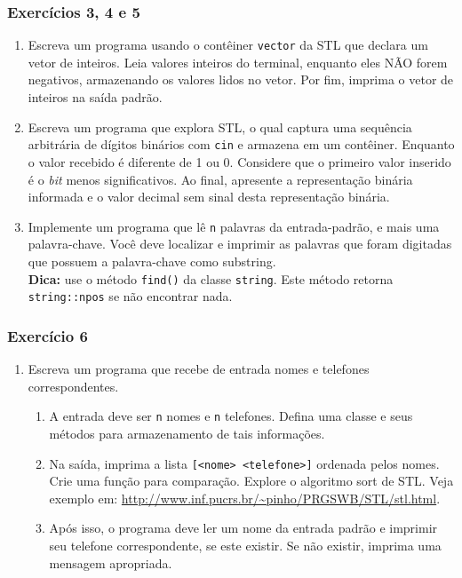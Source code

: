 \documentclass[xcolor={dvipsnames,table},aspectratio=169]{beamer}
\newcommand\setItemnumber[1]{\setcounter{enumi}{\numexpr#1-1\relax}}
\begin{document}
\begin{frame}[fragile]\frametitle{Exercícios 3, 4 e 5}
\begin{enumerate}
	\setItemnumber{3}
	\item Escreva um programa usando o contêiner \texttt{vector} da STL que declara um vetor de inteiros. Leia valores inteiros do terminal, enquanto eles NÃO forem negativos, armazenando os valores lidos no vetor. Por fim, imprima o vetor de inteiros na saída padrão.
	\item Escreva um programa que explora STL, o qual captura uma sequência arbitrária de dígitos binários com \texttt{cin} e armazena em um contêiner. Enquanto o valor recebido é diferente de 1 ou 0. Considere que o primeiro valor inserido é o \emph{bit} menos significativos. Ao final, apresente a representação binária informada e o valor decimal sem sinal desta representação binária.
	\item Implemente um programa que lê \texttt{n} palavras da entrada-padrão, e mais uma palavra-chave. Você deve localizar e imprimir as palavras que foram digitadas que possuem a palavra-chave como substring.\\
	\textbf{Dica:} use o método \texttt{find()} da classe \texttt{string}. Este método retorna \texttt{string::npos} se não encontrar nada.
\end{enumerate}
\end{frame}


\begin{frame}[fragile]\frametitle{Exercício 6}
\begin{enumerate}
	\setItemnumber{6}
	\item Escreva um programa que recebe de entrada nomes e telefones correspondentes.
	\begin{enumerate}[a]
		\item A entrada deve ser \texttt{n} nomes e \texttt{n} telefones. Defina uma classe e seus métodos para armazenamento de tais informações.
		\item Na saída, imprima a lista \texttt{[<nome> <telefone>]} ordenada pelos nomes. Crie uma função para comparação. Explore o algoritmo sort de STL. Veja exemplo em: \url{http://www.inf.pucrs.br/~pinho/PRGSWB/STL/stl.html}.
		\item Após isso, o programa deve ler um nome da entrada padrão e imprimir seu telefone correspondente, se este existir. Se não existir, imprima uma mensagem apropriada.
	\end{enumerate}
\end{enumerate}
\end{frame}
\end{document}
